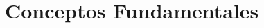 \documentclass[aspectratio=169,xcolor=dvipsnames]{beamer}
\begin{document}








\section{Conceptos Fundamentales}
\end{document}
